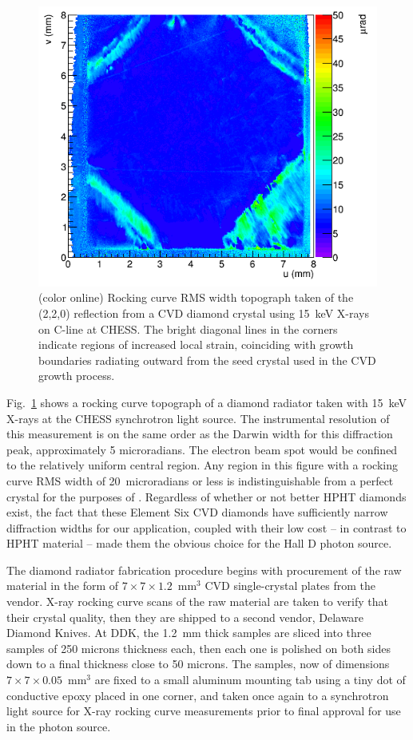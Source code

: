 \begin{figure}[tbp]
\begin{center}
 \includegraphics[clip=true,width=0.7\linewidth]{figures/JD70-8-study1_4_sigma_cropped.png}
\end{center}
\caption{(color online) Rocking curve RMS width topograph taken of the (2,2,0) reflection
from a CVD diamond crystal using 15~keV X-rays on C-line at CHESS.
The bright diagonal lines in the corners
indicate regions of increased local strain, coinciding with growth boundaries radiating
outward from the seed crystal used in the CVD growth process. 
        }
\label{fig:diamond_rocking_curve_rms} 
\end{figure}

Fig.~\ref{fig:diamond_rocking_curve_rms} shows a rocking curve topograph of a diamond
radiator taken with 15~keV X-rays at the CHESS synchrotron light source. The instrumental
resolution of this measurement is on the same order as the Darwin width for this
diffraction peak, approximately 5 microradians. The electron beam spot would
be confined to the relatively uniform central region. Any region in
this figure with a rocking curve RMS width of 20~microradians or less is indistinguishable
from a perfect crystal for the purposes of \GX{}.
Regardless of whether or not better HPHT diamonds exist, the fact that these Element Six
CVD diamonds have sufficiently narrow diffraction widths for our application, coupled with
their low cost -- in contrast to HPHT material -- made them the
obvious choice for the Hall D photon source.

The diamond radiator fabrication procedure begins with procurement of the raw
material in the form of $7\times 7\times 1.2$~mm$^3$ CVD single-crystal plates from the
vendor. X-ray rocking curve scans of the raw material are taken to verify that their crystal
quality, then they are shipped to a second vendor, Delaware Diamond Knives. At DDK, the
1.2~mm thick samples are sliced into three samples of 250 microns thickness each, then
each one is polished on both sides down to a final thickness close to 50 microns. The
samples, now of dimensions $7\times 7\times 0.05$~mm$^3$ are fixed to a small aluminum
mounting tab using a tiny dot of conductive epoxy placed in one corner, and taken once
again to a synchrotron light source for X-ray rocking curve measurements prior to final
approval for use in the \GX{} photon source.

